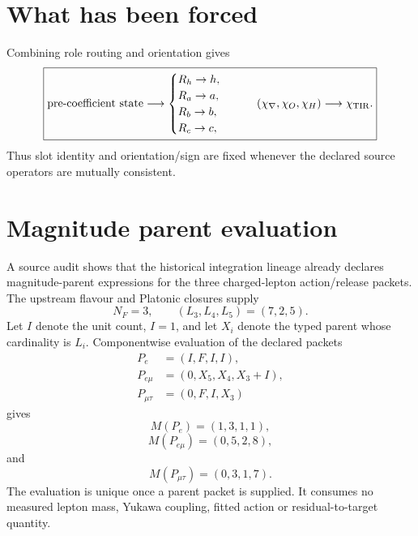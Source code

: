 
\section{What has been forced}
Combining role routing and orientation gives
\begin{equation}
\boxed{
\text{pre-coefficient state}
\longrightarrow
\begin{cases}
R_h\to h,\\
R_a\to a,\\
R_b\to b,\\
R_c\to c,
\end{cases}
\qquad
(\chi_\nabla,\chi_O,\chi_H)
\longrightarrow\chi_{\rm TIR}.
}
\label{eq:v12-coefficient-forcing-chain}
\end{equation}
Thus slot identity and orientation/sign are fixed whenever the declared source
operators are mutually consistent.

\section{Magnitude parent evaluation}
A source audit shows that the historical integration lineage already declares
magnitude-parent expressions for the three charged-lepton action/release
packets. The upstream flavour and Platonic closures supply
\begin{equation}
\boxed{N_F=3,\qquad (L_3,L_4,L_5)=(7,2,5).}
\label{eq:v12-magnitude-upstream-integers}
\end{equation}
Let $I$ denote the unit count, $I=1$, and let $X_i$ denote the typed parent
whose cardinality is $L_i$. Componentwise evaluation of the declared packets
\begin{align}
P_e&=(I,F,I,I),\\
P_{e\mu}&=(0,X_5,X_4,X_3+I),\\
P_{\mu\tau}&=(0,F,I,X_3)
\end{align}
gives
\begin{equation}
\boxed{M(P_e)=(1,3,1,1),}
\label{eq:v12-magnitude-electron}
\end{equation}
\begin{equation}
\boxed{M(P_{e\mu})=(0,5,2,8),}
\label{eq:v12-magnitude-emu}
\end{equation}
and
\begin{equation}
\boxed{M(P_{\mu\tau})=(0,3,1,7).}
\label{eq:v12-magnitude-mutau}
\end{equation}
The evaluation is unique once a parent packet is supplied. It consumes no
measured lepton mass, Yukawa coupling, fitted action or residual-to-target
quantity.

